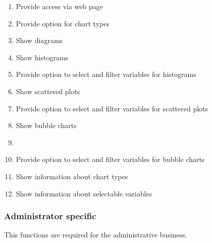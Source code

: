 \begin{enumerate}
  \item Provide access via web page \label{f1}
    
  \item Provide option for chart types \label{f2}
  
  \item Show diagrams \label{f3}
  
  \item Show histograms \label{f4} %
    
  
  \item Provide option to select and filter variables for histograms \label{f6}
  
  
  \item Show scattered plots \label{f7} %
  
  
  \item Provide option to select and filter variables for scattered plots \label{f9} 
  
  \item Show bubble charts \label{f10} %
  
  \item \item Provide option to select and filter variables for bubble charts \label{f11}
  
  
  \item Show information about chart types \label{f13}
  
  \item Show information about selectable variables\label{f14}
  
\end{enumerate}


\subsubsection*{Administrator specific}
This functions are required for the administrative business.

